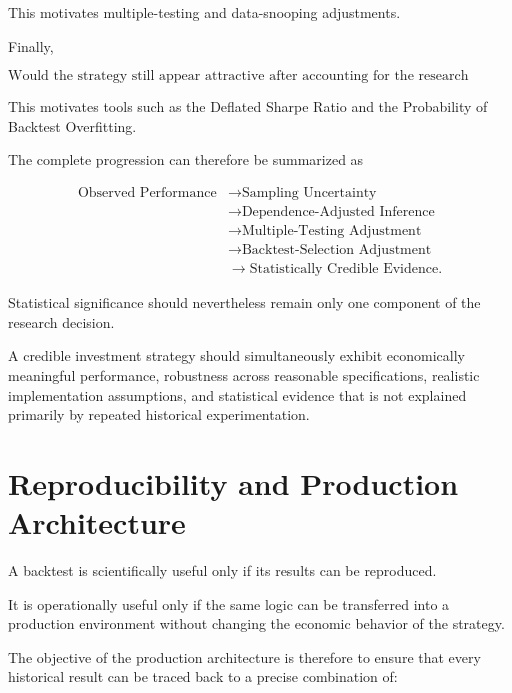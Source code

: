 \documentclass[11pt,a4paper]{article}
\begin{document}
This motivates multiple-testing and data-snooping adjustments.

Finally,

\begin{equation}
\boxed{
\text{Would the strategy still appear attractive after accounting for the
research process that produced it?}
}
\end{equation}

This motivates tools such as the Deflated Sharpe Ratio and the Probability of
Backtest Overfitting.

The complete progression can therefore be summarized as

\begin{equation}
\boxed{
\begin{aligned}
\text{Observed Performance}
&\rightarrow
\text{Sampling Uncertainty}
\\
&\rightarrow
\text{Dependence-Adjusted Inference}
\\
&\rightarrow
\text{Multiple-Testing Adjustment}
\\
&\rightarrow
\text{Backtest-Selection Adjustment}
\\
&\rightarrow
\text{Statistically Credible Evidence}.
\end{aligned}
}
\end{equation}

Statistical significance should nevertheless remain only one component of the
research decision.

A credible investment strategy should simultaneously exhibit economically
meaningful performance, robustness across reasonable specifications, realistic
implementation assumptions, and statistical evidence that is not explained
primarily by repeated historical experimentation.


\section{Reproducibility and Production Architecture}
\label{sec:reproducibility_production}

A backtest is scientifically useful only if its results can be reproduced.

It is operationally useful only if the same logic can be transferred into a
production environment without changing the economic behavior of the strategy.

The objective of the production architecture is therefore to ensure that every
historical result can be traced back to a precise combination of:
\end{document}
